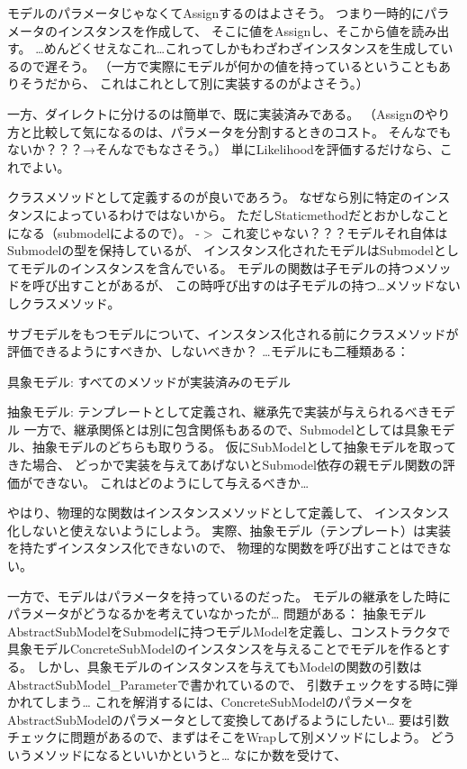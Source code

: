 モデルのパラメータじゃなくて\+Assignするのはよさそう。 つまり一時的にパラメータのインスタンスを作成して、 そこに値を\+Assignし、そこから値を読み出す。 …めんどくせえなこれ…これってしかもわざわざインスタンスを生成しているので遅そう。 （一方で実際にモデルが何かの値を持っているということもありそうだから、 これはこれとして別に実装するのがよさそう。）

一方、ダイレクトに分けるのは簡単で、既に実装済みである。 （\+Assignのやり方と比較して気になるのは、パラメータを分割するときのコスト。 そんなでもないか？？？→そんなでもなさそう。） 単に\+Likelihoodを評価するだけなら、これでよい。

クラスメソッドとして定義するのが良いであろう。 なぜなら別に特定のインスタンスによっているわけではないから。 ただし\+Staticmethodだとおかしなことになる（submodelによるので）。 -\/$>$ これ変じゃない？？？モデルそれ自体は\+Submodelの型を保持しているが、 インスタンス化されたモデルは\+Submodelとしてモデルのインスタンスを含んでいる。 モデルの関数は子モデルの持つメソッドを呼び出すことがあるが、 この時呼び出すのは子モデルの持つ…メソッドないしクラスメソッド。

サブモデルをもつモデルについて、インスタンス化される前にクラスメソッドが評価できるようにすべきか、しないべきか？ …モデルにも二種類ある：
\begin{DoxyItemize}
\item 具象モデル\+: すべてのメソッドが実装済みのモデル
\item 抽象モデル\+: テンプレートとして定義され、継承先で実装が与えられるべきモデル 一方で、継承関係とは別に包含関係もあるので、\+Submodelとしては具象モデル、抽象モデルのどちらも取りうる。 仮に\+Sub\+Modelとして抽象モデルを取ってきた場合、 どっかで実装を与えてあげないと\+Submodel依存の親モデル関数の評価ができない。 これはどのようにして与えるべきか…
\end{DoxyItemize}

やはり、物理的な関数はインスタンスメソッドとして定義して、 インスタンス化しないと使えないようにしよう。 実際、抽象モデル（テンプレート）は実装を持たずインスタンス化できないので、 物理的な関数を呼び出すことはできない。

一方で、モデルはパラメータを持っているのだった。 モデルの継承をした時にパラメータがどうなるかを考えていなかったが… 問題がある： 抽象モデル\+Abstract\+Sub\+Modelを\+Submodelに持つモデル\+Modelを定義し、コンストラクタで 具象モデル\+Concrete\+Sub\+Modelのインスタンスを与えることでモデルを作るとする。 しかし、具象モデルのインスタンスを与えても\+Modelの関数の引数は\+Abstract\+Sub\+Model\+\_\+\+Parameterで書かれているので、 引数チェックをする時に弾かれてしまう… これを解消するには、\+Concrete\+Sub\+Modelのパラメータを\+Abstract\+Sub\+Modelのパラメータとして変換してあげるようにしたい… 要は引数チェックに問題があるので、まずはそこを\+Wrapして別メソッドにしよう。 どういうメソッドになるといいかというと… なにか数を受けて、

